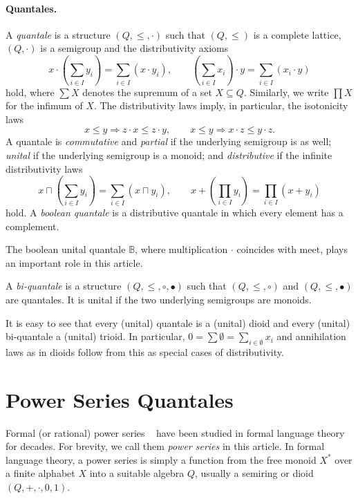 \documentclass[12pt]{article}
\newcommand{\Al}{X}
\theoremstyle{definition}
\begin{document}
\paragraph{Quantales.}
A \emph{quantale} is a structure $(Q,\le,\cdot)$ such that $(Q,\le)$
is a complete lattice, $(Q,\cdot)$ is a semigroup and the
distributivity axioms
\begin{equation*}
  x\cdot (\sum_{i\in I}y_i) = \sum_{i\in I} (x\cdot y_i),\qquad (\sum_{i\in I} x_i)\cdot y = \sum_{i\in I}(x_i\cdot y) 
\end{equation*}
hold, where $\sum X$ denotes the supremum of a set $X\subseteq
Q$. Similarly, we write $\prod X$ for the infimum of $X$.  The
distributivity laws imply, in particular, the  isotonicity
laws
\begin{equation*}
  x
  \le y  \Rightarrow   z\cdot x \le z\cdot y, \qquad
  x\le y  \Rightarrow  
  x\cdot z \le y\cdot z.
\end{equation*}  
A quantale is \emph{commutative} and
\emph{partial} if the underlying semigroup is as well; \emph{unital} if the
underlying semigroup is a monoid; and \emph{distributive} if the
infinite distributivity laws
\begin{equation*}
  x\sqcap (\sum_{i\in I} y_i) = \sum_{i\in I} (x\sqcap y_i),\qquad 
  x+ (\prod_{i\in I} y_i) = \prod_{i\in I} (x+ y_i) 
\end{equation*}
hold. A \emph{boolean quantale} is a distributive quantale in which
every element has a complement. 

The boolean unital quantale $\mathbb{B}$, where multiplication $\cdot$
coincides with meet, plays an important role in this article.

A \emph{bi-quantale} is a structure $(Q,\le,\circ,\bullet)$ such that
$(Q,\le,\circ)$ and $(Q,\le,\bullet)$ are quantales. It is unital if
the two underlying semigroups are monoids.

It is easy to see that every (unital) quantale is a (unital) dioid and
every (unital) bi-quantale a (unital) trioid. In particular,
$0=\sum\emptyset =\sum_{i\in\emptyset} x_i$ and annihilation laws as
in dioids follow from this as special cases of distributivity.



\section{Power Series Quantales}\label{sec:fpsquantale}

Formal (or rational) power series ~\cite{BerstelReutenauer} have been
studied in formal language theory for decades. For brevity, we call
them \emph{power series} in this article.
In formal language theory, a power series is simply a function from the
free monoid $\Al^\ast$ over a finite alphabet $\Al$ into a suitable
algebra $Q$, usually a semiring or dioid $(Q,+,\cdot,0,1)$.
\end{document}
